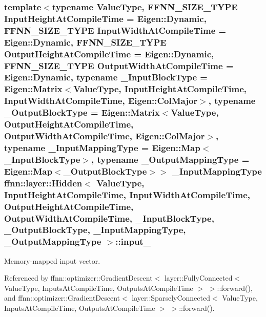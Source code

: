 \hypertarget{classffnn_1_1layer_1_1_hidden_aec535cd632fce55d43fc91b04b95c836}{
\subsubsection[{input\-\_\-}]{\setlength{\rightskip}{0pt plus 5cm}template$<$typename Value\-Type, F\-F\-N\-N\-\_\-\-S\-I\-Z\-E\-\_\-\-T\-Y\-P\-E Input\-Height\-At\-Compile\-Time = Eigen\-::\-Dynamic, F\-F\-N\-N\-\_\-\-S\-I\-Z\-E\-\_\-\-T\-Y\-P\-E Input\-Width\-At\-Compile\-Time = Eigen\-::\-Dynamic, F\-F\-N\-N\-\_\-\-S\-I\-Z\-E\-\_\-\-T\-Y\-P\-E Output\-Height\-At\-Compile\-Time = Eigen\-::\-Dynamic, F\-F\-N\-N\-\_\-\-S\-I\-Z\-E\-\_\-\-T\-Y\-P\-E Output\-Width\-At\-Compile\-Time = Eigen\-::\-Dynamic, typename \-\_\-\-Input\-Block\-Type = Eigen\-::\-Matrix$<$\-Value\-Type, Input\-Height\-At\-Compile\-Time, Input\-Width\-At\-Compile\-Time, Eigen\-::\-Col\-Major$>$, typename \-\_\-\-Output\-Block\-Type = Eigen\-::\-Matrix$<$\-Value\-Type, Output\-Height\-At\-Compile\-Time, Output\-Width\-At\-Compile\-Time, Eigen\-::\-Col\-Major$>$, typename \-\_\-\-Input\-Mapping\-Type = Eigen\-::\-Map$<$\-\_\-\-Input\-Block\-Type$>$, typename \-\_\-\-Output\-Mapping\-Type = Eigen\-::\-Map$<$\-\_\-\-Output\-Block\-Type$>$$>$ \-\_\-\-Input\-Mapping\-Type {\bf ffnn\-::layer\-::\-Hidden}$<$ Value\-Type, Input\-Height\-At\-Compile\-Time, Input\-Width\-At\-Compile\-Time, Output\-Height\-At\-Compile\-Time, Output\-Width\-At\-Compile\-Time, \-\_\-\-Input\-Block\-Type, \-\_\-\-Output\-Block\-Type, \-\_\-\-Input\-Mapping\-Type, \-\_\-\-Output\-Mapping\-Type $>$\-::input\-\_\-\hspace{0.3cm}{\ttfamily [protected]}}}\label{classffnn_1_1layer_1_1_hidden_aec535cd632fce55d43fc91b04b95c836}


Memory-\/mapped input vector. 



Referenced by ffnn\-::optimizer\-::\-Gradient\-Descent$<$ layer\-::\-Fully\-Connected$<$ Value\-Type, Inputs\-At\-Compile\-Time, Outputs\-At\-Compile\-Time $>$ $>$\-::forward(), and ffnn\-::optimizer\-::\-Gradient\-Descent$<$ layer\-::\-Sparsely\-Connected$<$ Value\-Type, Inputs\-At\-Compile\-Time, Outputs\-At\-Compile\-Time $>$ $>$\-::forward().

